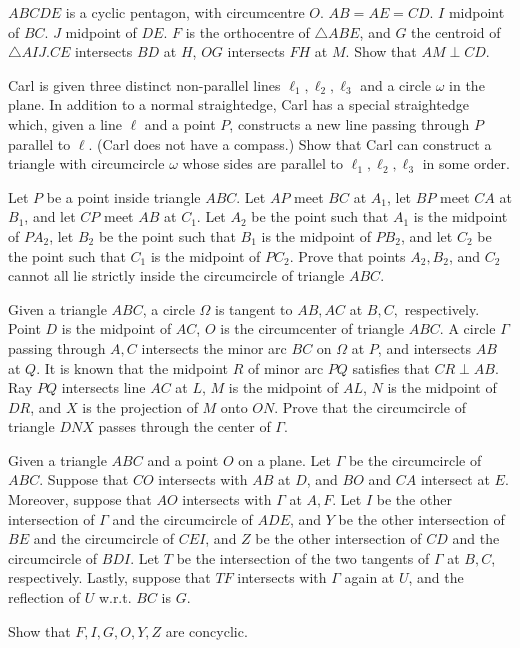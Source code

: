 \documentclass[11pt]{scrartcl}
\begin{document}
\begin{problem}[8811824418974048155]
$ABCDE$ is a cyclic pentagon, with circumcentre $O$. $AB=AE=CD$. $I$ midpoint of $BC$. $J$ midpoint of $DE$. $F$ is the orthocentre of $\triangle ABE$, and $G$ the centroid of $\triangle AIJ$.$CE$ intersects $BD$ at $H$, $OG$ intersects $FH$ at $M$. Show that $AM\perp CD$.
\end{problem}
\begin{problem}[6306108494297192985]
Carl is given three distinct non-parallel lines $\ell_1, \ell_2, \ell_3$ and a circle $\omega$ in the plane. In addition to a normal straightedge, Carl has a special straightedge which, given a line $\ell$ and a point $P$, constructs a new line passing through $P$ parallel to $\ell$. (Carl does not have a compass.) Show that Carl can construct a triangle with circumcircle $\omega$ whose sides are parallel to $\ell_1,\ell_2,\ell_3$ in some order.
\end{problem}
\begin{problem}[3245291910836201005]
	Let $P$ be a point inside triangle $ABC$. Let $AP$ meet $BC$ at $A_1$, let $BP$ meet $CA$ at $B_1$, and let $CP$ meet $AB$ at $C_1$. Let $A_2$ be the point such that $A_1$ is the midpoint of $PA_2$, let $B_2$ be the point such that $B_1$ is the midpoint of $PB_2$, and let $C_2$ be the point such that $C_1$ is the midpoint of $PC_2$. Prove that points $A_2, B_2$, and $C_2$ cannot all lie strictly inside the circumcircle of triangle $ABC$.
\end{problem}
\begin{problem}[1222382895728709073]
	Given a triangle $ABC$, a circle $\Omega$ is tangent to $AB,AC$ at $B,C,$ respectively. Point $D$ is the midpoint of $AC$, $O$ is the circumcenter of triangle $ABC$. A circle $\Gamma$ passing through $A,C$ intersects the minor arc $BC$ on $\Omega$ at $P$, and intersects $AB$ at $Q$. It is known that the midpoint $R$ of minor arc $PQ$ satisfies that $CR \perp AB$. Ray $PQ$ intersects line $AC$ at $L$, $M$ is the midpoint of $AL$, $N$ is the midpoint of $DR$, and $X$ is the projection of $M$ onto $ON$. Prove that the circumcircle of triangle $DNX$ passes through the center of $\Gamma$.
\end{problem}
\begin{problem}[2003233604438068678]
Given a triangle $ABC$ and a point $O$ on a plane. Let $\Gamma$ be the circumcircle of $ABC$. Suppose that $CO$ intersects with $AB$ at $D$, and $BO$ and $CA$ intersect at $E$. Moreover, suppose that $AO$ intersects with $\Gamma$ at $A,F$. Let $I$ be the other intersection of $\Gamma$ and the circumcircle of $ADE$, and $Y$ be the other intersection of $BE$ and the circumcircle of $CEI$, and $Z$ be the other intersection of $CD$ and the circumcircle of $BDI$. Let $T$ be the intersection of the two tangents of $\Gamma$ at $B,C$, respectively. Lastly, suppose that $TF$ intersects with $\Gamma$ again at $U$, and the reflection of $U$ w.r.t. $BC$ is $G$.

Show that $F,I,G,O,Y,Z$ are concyclic.
\end{problem}
\end{document}
